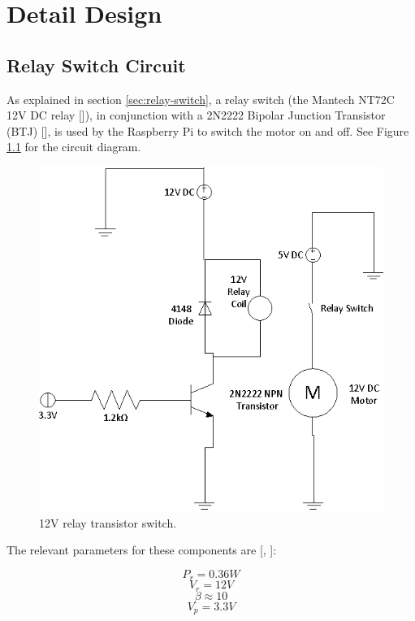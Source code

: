 \chapter{Detail Design}

\section{Relay Switch Circuit}

As explained in section \ref{sec:relay-switch}, a relay switch (the Mantech NT72C 12V DC relay
[\cite{manual:relay-specs}]), in conjunction with a 2N2222 Bipolar Junction Transistor (BTJ)
[\cite{manual:transistor-datasheet}], is used by the Raspberry Pi to switch the motor on and
off. See Figure \ref{fig:relay-switch} for the circuit diagram.

\begin{figure}[h]
\centering
\includegraphics[scale=0.7]{relay_switch.eps}
\caption{12V relay transistor switch. }
\label{fig:relay-switch}
\end{figure}

The relevant  parameters for these components are [\cite{manual:relay-specs},
\cite{manual:transistor-datasheet}]:

\[ P_{r} = 0.36W\]
\[ V_{r} = 12V\]
\[ \beta \approx 10\]
\[ V_{p} = 3.3V\]

